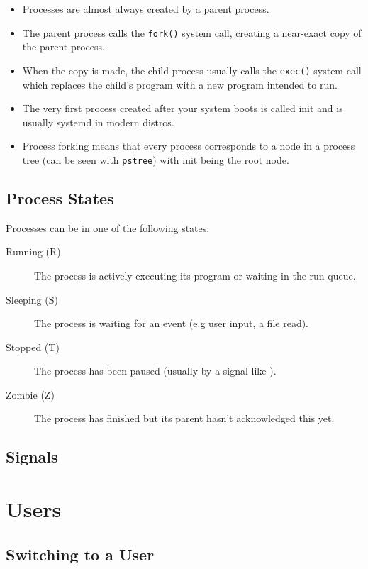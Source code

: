 \documentclass{article}
\newcommand{\code}[1]{\texttt{#1}}
\begin{document}
\begin{itemize}
    \item Processes are almost always created by a parent process.
    \item The parent process calls the \code{fork()} system call, creating a near-exact copy of the parent process.
    \item When the copy is made, the child process usually calls the \code{exec()} system call which replaces the child's program with a new program intended to run.
    \item The very first process created after your system boots is called init and is usually systemd in modern distros.
    \item Process forking means that every process corresponds to a node in a process tree (can be seen with \code{pstree}) with init being the root node.
\end{itemize}

\subsection{Process States}

Processes can be in one of the following states:

\begin{description}
    \item[Running (R)] The process is actively executing its program or waiting in the run queue.
    \item[Sleeping (S)] The process is waiting for an event (e.g user input, a file read).
    \item[Stopped (T)] The process has been paused (usually by a signal like ).
    \item[Zombie (Z)] The process has finished but its parent hasn't acknowledged this yet.
\end{description}

\subsection{Signals}


\section{Users}

\subsection{Switching to a User}
\end{document}

